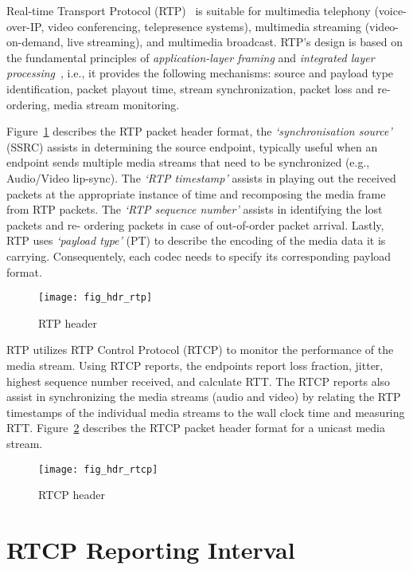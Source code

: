 
Real-time Transport Protocol (RTP)~\cite{rfc3550} is suitable for multimedia
telephony (voice-over-IP, video conferencing, telepresence systems),
multimedia streaming (video-on-demand, live streaming), and multimedia
broadcast. RTP's design is based on the fundamental principles of \textit
{application-layer framing} and \textit{integrated layer
processing}~\cite{clark:alf}, i.e., it provides the following mechanisms:
source and payload type identification, packet playout time, stream
synchronization, packet loss and re-ordering, media stream monitoring.

Figure~\ref{fig:3:rtp.hdr} describes the RTP packet header format, the
\textit{`synchronisation source'} (SSRC) assists in determining the source
endpoint, typically useful when an endpoint sends multiple media streams that
need to be synchronized (e.g., Audio/Video lip-sync). The \textit{`RTP
timestamp'} assists in playing out the received packets at the appropriate
instance of time and recomposing the media frame from RTP packets. The
\textit{`RTP sequence number'} assists in identifying the lost packets and re-
ordering packets in case of out-of-order packet arrival. Lastly, RTP uses
\textit{`payload type'} (PT) to describe the encoding of the media data it is
carrying. Consequentely, each codec needs to specify its corresponding payload
format.

\begin{figure}[!htbp]
\centerline{\texttt{[image: fig\_hdr\_rtp]}}
\caption{RTP header}
\label{fig:3:rtp.hdr}
\end{figure}

RTP utilizes RTP Control Protocol (RTCP) to monitor the performance of the
media stream. Using RTCP reports, the endpoints report loss fraction, jitter,
highest sequence number received, and calculate RTT. The RTCP reports also
assist in synchronizing the media streams (audio and video) by relating the
RTP timestamps of the individual media streams to the wall clock time and
measuring RTT. Figure~\ref{fig:3:rtcp.hdr} describes the RTCP packet header
format for a unicast media stream.

\begin{figure}
\centerline{\texttt{[image: fig\_hdr\_rtcp]}}
\caption{RTCP header}
\label{fig:3:rtcp.hdr}
\end{figure}

\section{RTCP Reporting Interval}

